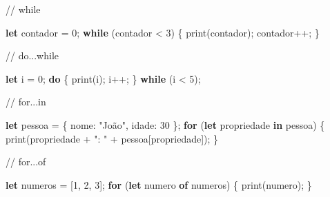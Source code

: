 \documentclass[
  portuguese,
  letterpaper,
  DIV=11,
  numbers=noendperiod]{scrreprt}
\newenvironment{Shaded}{\begin{snugshade}}{\end{snugshade}}
\newcommand{\CommentTok}[1]{\textcolor[rgb]{0.37,0.37,0.37}{#1}}
\newcommand{\ControlFlowTok}[1]{\textcolor[rgb]{0.00,0.23,0.31}{\textbf{#1}}}
\newcommand{\DataTypeTok}[1]{\textcolor[rgb]{0.68,0.00,0.00}{#1}}
\newcommand{\DecValTok}[1]{\textcolor[rgb]{0.68,0.00,0.00}{#1}}
\newcommand{\FunctionTok}[1]{\textcolor[rgb]{0.28,0.35,0.67}{#1}}
\newcommand{\KeywordTok}[1]{\textcolor[rgb]{0.00,0.23,0.31}{\textbf{#1}}}
\newcommand{\NormalTok}[1]{\textcolor[rgb]{0.00,0.23,0.31}{#1}}
\newcommand{\OperatorTok}[1]{\textcolor[rgb]{0.37,0.37,0.37}{#1}}
\newcommand{\StringTok}[1]{\textcolor[rgb]{0.13,0.47,0.30}{#1}}
\begin{document}
\begin{Shaded}
\begin{Highlighting}[]
\CommentTok{// while}

\KeywordTok{let}\NormalTok{ contador }\OperatorTok{=} \DecValTok{0}\OperatorTok{;}
\ControlFlowTok{while}\NormalTok{ (contador }\OperatorTok{\textless{}} \DecValTok{3}\NormalTok{) \{}
  \FunctionTok{print}\NormalTok{(contador)}\OperatorTok{;}
\NormalTok{  contador}\OperatorTok{++;}
\NormalTok{\}}
\end{Highlighting}
\end{Shaded}

\begin{Shaded}
\begin{Highlighting}[]
\CommentTok{// do...while}

\KeywordTok{let}\NormalTok{ i }\OperatorTok{=} \DecValTok{0}\OperatorTok{;}
\ControlFlowTok{do}\NormalTok{ \{}
    \FunctionTok{print}\NormalTok{(i)}\OperatorTok{;}
\NormalTok{    i}\OperatorTok{++;}
\NormalTok{\} }\ControlFlowTok{while}\NormalTok{ (i }\OperatorTok{\textless{}} \DecValTok{5}\NormalTok{)}\OperatorTok{;}
\end{Highlighting}
\end{Shaded}

\begin{Shaded}
\begin{Highlighting}[]
\CommentTok{// for...in}

\KeywordTok{let}\NormalTok{ pessoa }\OperatorTok{=}\NormalTok{ \{ }\DataTypeTok{nome}\OperatorTok{:} \StringTok{"João"}\OperatorTok{,} \DataTypeTok{idade}\OperatorTok{:} \DecValTok{30}\NormalTok{ \}}\OperatorTok{;}
\ControlFlowTok{for}\NormalTok{ (}\KeywordTok{let}\NormalTok{ propriedade }\KeywordTok{in}\NormalTok{ pessoa) \{}
  \FunctionTok{print}\NormalTok{(propriedade }\OperatorTok{+} \StringTok{": "} \OperatorTok{+}\NormalTok{ pessoa[propriedade])}\OperatorTok{;}
\NormalTok{\}}
\end{Highlighting}
\end{Shaded}

\begin{Shaded}
\begin{Highlighting}[]
\CommentTok{// for...of}

\KeywordTok{let}\NormalTok{ numeros }\OperatorTok{=}\NormalTok{ [}\DecValTok{1}\OperatorTok{,} \DecValTok{2}\OperatorTok{,} \DecValTok{3}\NormalTok{]}\OperatorTok{;}
\ControlFlowTok{for}\NormalTok{ (}\KeywordTok{let}\NormalTok{ numero }\KeywordTok{of}\NormalTok{ numeros) \{}
  \FunctionTok{print}\NormalTok{(numero)}\OperatorTok{;}
\NormalTok{\}}
\end{Highlighting}
\end{Shaded}
\end{document}
